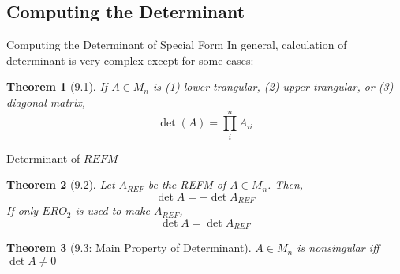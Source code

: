 \documentclass[a4paper,11pt]{article}
\newtheorem{thm}{Theorem}
\begin{document}
\subsection{Computing the Determinant} %
\label{sub:computing_the_determinant}
\begin{frame}[t]{Computing the Determinant of Special Form}
	In general, calculation of determinant is very complex except for some cases:
	\begin{thm}
		[9.1] If $A\in M_n$ is (1) lower-trangular, (2) upper-trangular, or (3) diagonal matrix, \[
			\det (A) = \prod_i^n A_{ii}
		\]
	\end{thm}
\end{frame}
\begin{frame}[t]{Determinant of $REFM$}
	\begin{thm}
		[9.2] Let $A_{REF}$ be the REFM of $A\in M_n$. Then, 
		\[
			\det A = \pm \det A_{REF}
		\] If only $ERO_2$ is used to make $A_{REF}$, 
		\[
			\det A  = \det A_{REF}
		\]
	\end{thm}
	\begin{thm}
		[9.3: Main Property of Determinant] $A\in M_n$ is nonsingular iff $\det A \neq 0$
	\end{thm}
\end{frame}
\end{document}
